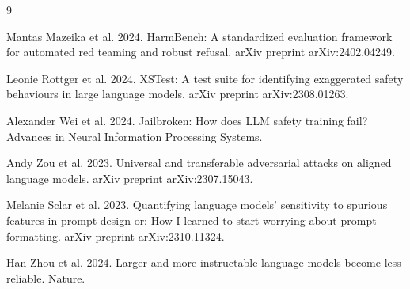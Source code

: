 \documentclass[11pt]{article}
\begin{document}
\begin{thebibliography}{9}\footnotesize

Mantas Mazeika et al. 2024.
HarmBench: A standardized evaluation framework for automated red teaming and robust refusal.
arXiv preprint arXiv:2402.04249.

Leonie Rottger et al. 2024.
XSTest: A test suite for identifying exaggerated safety behaviours in large language models.
arXiv preprint arXiv:2308.01263.

Alexander Wei et al. 2024.
Jailbroken: How does LLM safety training fail?
Advances in Neural Information Processing Systems.

Andy Zou et al. 2023.
Universal and transferable adversarial attacks on aligned language models.
arXiv preprint arXiv:2307.15043.

Melanie Sclar et al. 2023.
Quantifying language models' sensitivity to spurious features in prompt design or: How I learned to start worrying about prompt formatting.
arXiv preprint arXiv:2310.11324.

Han Zhou et al. 2024.
Larger and more instructable language models become less reliable.
Nature.

\end{thebibliography}
\end{document}
